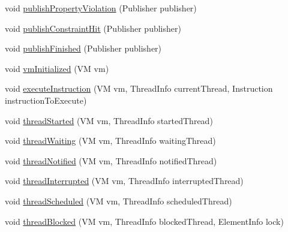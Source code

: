 \begin{DoxyCompactItemize}
\item 
void \hyperlink{classgov_1_1nasa_1_1jpf_1_1inspector_1_1server_1_1jpf_1_1_inspector_listener_ae0653c39fb4ae5838271c27c0e5d89b6}{publish\+Property\+Violation} (Publisher publisher)
\item 
void \hyperlink{classgov_1_1nasa_1_1jpf_1_1inspector_1_1server_1_1jpf_1_1_inspector_listener_a48bce14fcdae1ea25266c3212b1e8064}{publish\+Constraint\+Hit} (Publisher publisher)
\item 
void \hyperlink{classgov_1_1nasa_1_1jpf_1_1inspector_1_1server_1_1jpf_1_1_inspector_listener_a516a5ac116c701fbbf7ee1b9a7ec4f82}{publish\+Finished} (Publisher publisher)
\item 
void \hyperlink{classgov_1_1nasa_1_1jpf_1_1inspector_1_1server_1_1jpf_1_1_inspector_listener_a0bd1bb335be04cb30f826dd7b41e63b3}{vm\+Initialized} (VM vm)
\item 
void \hyperlink{classgov_1_1nasa_1_1jpf_1_1inspector_1_1server_1_1jpf_1_1_inspector_listener_a0fe50245378d0368e72dc38824d56cd3}{execute\+Instruction} (VM vm, Thread\+Info current\+Thread, Instruction instruction\+To\+Execute)
\item 
void \hyperlink{classgov_1_1nasa_1_1jpf_1_1inspector_1_1server_1_1jpf_1_1_inspector_listener_ab82e6ed751ae5dfbf455ca1c816b6e00}{thread\+Started} (VM vm, Thread\+Info started\+Thread)
\item 
void \hyperlink{classgov_1_1nasa_1_1jpf_1_1inspector_1_1server_1_1jpf_1_1_inspector_listener_a3c0e9ef709f90db65815ff48b8f4edd9}{thread\+Waiting} (VM vm, Thread\+Info waiting\+Thread)
\item 
void \hyperlink{classgov_1_1nasa_1_1jpf_1_1inspector_1_1server_1_1jpf_1_1_inspector_listener_a0ab4d4eb500d80fc7f776abaa8961ef8}{thread\+Notified} (VM vm, Thread\+Info notified\+Thread)
\item 
void \hyperlink{classgov_1_1nasa_1_1jpf_1_1inspector_1_1server_1_1jpf_1_1_inspector_listener_a4b22112be856c205d8ff36c7951c45f8}{thread\+Interrupted} (VM vm, Thread\+Info interrupted\+Thread)
\item 
void \hyperlink{classgov_1_1nasa_1_1jpf_1_1inspector_1_1server_1_1jpf_1_1_inspector_listener_aa2b9a7c58e0bfbe7242a3979624ff139}{thread\+Scheduled} (VM vm, Thread\+Info scheduled\+Thread)
\item 
void \hyperlink{classgov_1_1nasa_1_1jpf_1_1inspector_1_1server_1_1jpf_1_1_inspector_listener_ac20be0888a50399698a46198c9985a15}{thread\+Blocked} (VM vm, Thread\+Info blocked\+Thread, Element\+Info lock)
\item 

\end{DoxyCompactItemize}
